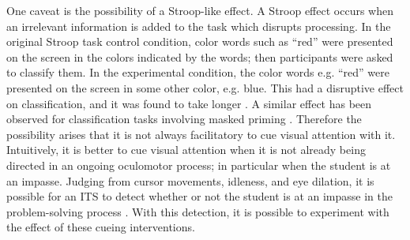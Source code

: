 \documentclass[hidelinks,11pt]{article}
\begin{document}
One caveat is the possibility of a Stroop-like effect. A Stroop effect occurs
when an irrelevant information is added to the task which disrupts processing.
In the original Stroop task control condition, color words such as ``red'' were
presented on the screen in the colors indicated by the words; then participants
were asked to classify them.  In the experimental condition, the color words
e.g. ``red'' were presented on the screen in some other color, e.g.  blue. This
had a disruptive effect on classification, and it was found to take longer
{\citep{stroop1935}}.  A similar effect has been observed for classification tasks
involving masked priming {\citep{neely1977}}.  Therefore the possibility arises
that it is not always facilitatory to cue visual attention with it.
Intuitively, it is better to cue visual attention when it is not already being
directed in an ongoing oculomotor process; in particular when the student is at
an impasse.  Judging from cursor movements, idleness, and eye dilation, it is
possible for an ITS to detect whether or not the student is at an impasse in
the problem-solving process {\citep{narayanan2014}}. With this detection, it is
possible to experiment with the effect of these cueing interventions. 



\end{document}
